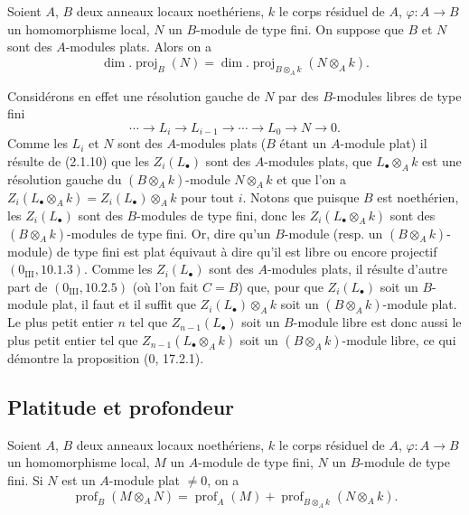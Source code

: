 
\begin{proposition}[6.2.3]
\label{IV.2.s6.2.3-fr}
Soient $A$, $B$ deux anneaux locaux noethériens, $k$ le corps résiduel de
$A$, $\varphi:A\to B$ un homomorphisme local, $N$ un $B$-module de type fini.
On suppose que $B$ et $N$ sont des $A$-modules plats. Alors on a
\begin{equation}
\dim.\operatorname{proj}_B(N)
=\dim.\operatorname{proj}_{B\otimes_Ak}(N\otimes_Ak).
\tag{6.2.3.1}\label{IV.2.s6.2.3.1-fr}
\end{equation}
\end{proposition}

Considérons en effet une résolution gauche de $N$ par des $B$-modules libres
de type fini
\[
\cdots\to L_i\to L_{i-1}\to\cdots\to L_0\to N\to0.
\]
Comme les $L_i$ et $N$ sont des $A$-modules plats ($B$ étant un $A$-module
plat) il résulte de (2.1.10) que les $Z_i(L_\bullet)$ sont des $A$-modules
plats, que $L_\bullet\otimes_Ak$ est une résolution gauche du
$(B\otimes_Ak)$-module $N\otimes_Ak$ et que l'on a
$Z_i(L_\bullet\otimes_Ak)=Z_i(L_\bullet)\otimes_Ak$ pour tout $i$. Notons que
puisque $B$ est noethérien, les $Z_i(L_\bullet)$ sont des $B$-modules de type
fini, donc les $Z_i(L_\bullet\otimes_Ak)$ sont des $(B\otimes_Ak)$-modules de
type fini. Or, dire qu'un $B$-module (resp. un $(B\otimes_Ak)$-module) de type
fini est plat équivaut à dire qu'il est libre ou encore projectif
$(0_{\mathrm{III}}, 10.1.3)$. Comme les $Z_i(L_\bullet)$ sont des $A$-modules
plats, il résulte d'autre part de $(0_{\mathrm{III}}, 10.2.5)$ (où l'on fait
$C=B$) que, pour que $Z_i(L_\bullet)$ soit un $B$-module plat, il faut et il
suffit que $Z_i(L_\bullet)\otimes_Ak$ soit un $(B\otimes_Ak)$-module plat. Le
plus petit entier $n$ tel que $Z_{n-1}(L_\bullet)$ soit un $B$-module libre est
donc aussi le plus petit entier tel que $Z_{n-1}(L_\bullet\otimes_Ak)$ soit un
$(B\otimes_Ak)$-module libre, ce qui démontre la proposition (0, 17.2.1).

\subsection{Platitude et profondeur}

\begin{proposition}[6.3.1]
\label{IV.2.s6.3.1-fr}
Soient $A$, $B$ deux anneaux locaux noethériens, $k$ le corps résiduel de
$A$, $\varphi:A\to B$ un homomorphisme local, $M$ un $A$-module de type fini,
$N$ un $B$-module de type fini. Si $N$ est un $A$-module plat $\neq0$, on a
\begin{equation}
\operatorname{prof}_B(M\otimes_AN)=\operatorname{prof}_A(M)
+\operatorname{prof}_{B\otimes_Ak}(N\otimes_Ak).
\tag{6.3.1.1}\label{IV.2.s6.3.1.1-fr}
\end{equation}
\end{proposition}

